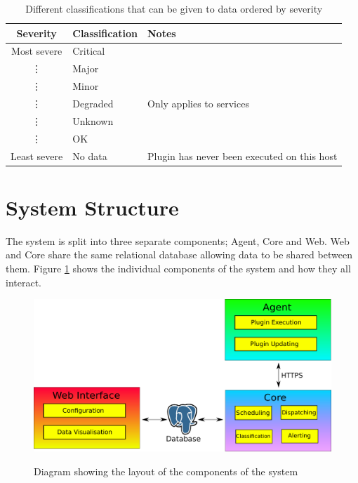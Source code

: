 \documentclass[bsc,logo,twoside,parskip,singlespacing,notimes]{infthesis}
\begin{document}
\begin{table}[H]
	\centering
	\caption{Different classifications that can be given to data ordered by severity}
	\label{table-classifications}
    \begin{tabular}{|c|l|l|}
    \hline
    Severity     & Classification & Notes                                       \\ \hline
    Most severe  & Critical       & ~                                           \\
    \vdots       & Major          & ~                                           \\
    \vdots       & Minor          & ~                                           \\
    \vdots       & Degraded       & Only applies to services                    \\
    \vdots       & Unknown        & ~                                           \\
    \vdots       & OK             & ~                                           \\
    Least severe & No data        & Plugin has never been executed on this host \\ \hline
    \end{tabular}
\end{table}

\section{System Structure}

	The system is split into three separate components; Agent, Core and Web. Web
	and Core share the same relational database allowing data to be shared
	between them.  Figure \ref{system_structure} shows the individual components of
	the system and how they all interact.

\begin{figure}[H]
	\caption{Diagram showing the layout of the components of the system}
	\includegraphics[scale=0.5]{assets/system_structure.pdf}
	\label{system_structure}
\end{figure}
\end{document}
